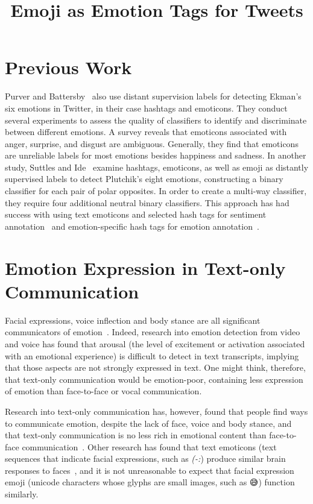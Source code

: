\documentclass[10pt, a4paper]{article}
\title{Emoji as Emotion Tags for Tweets}
\begin{document}
\maketitleabstract

\section{Previous Work} 
Purver and Battersby~ also use distant supervision labels for detecting Ekman’s six emotions in Twitter, in their case hashtags and emoticons. They conduct several experiments to assess the quality of classifiers to identify and discriminate between different emotions. A survey reveals that emoticons associated with anger, surprise, and disgust are ambiguous. Generally, they find that emoticons are unreliable labels for most emotions besides happiness and sadness. In another study, Suttles and Ide~ examine hashtags, emoticons, as well as emoji as distantly supervised labels to detect Plutchik’s eight emotions, constructing a binary classifier for each pair of polar opposites. In order to create a multi-way classifier, they require four additional neutral binary classifiers. 
This approach has had success with using text emoticons and selected hash tags for sentiment annotation~\cite{Davidov2010Enhanced} and emotion-specific hash tags for emotion annotation~\cite{Mohammad2012Emotional,Mohammad2015Using}.

\section{Emotion Expression in Text-only Communication}
\label{sec:emotion_expression_in_text_only_communication}
Facial expressions, voice inflection and body stance are all significant communicators of emotion~\cite{Johnston2015Apa}. 
Indeed, research into emotion detection from video and voice has found that arousal (the level of excitement or activation associated with an emotional experience) is 
difficult to detect in text transcripts, implying that those aspects are not strongly expressed in text.
One might think, therefore, that text-only communication would be emotion-poor, containing less expression of emotion than face-to-face or vocal communication.

Research into text-only communication has, however, found that people find ways to communicate emotion, despite the lack of face, voice and body stance, and that text-only communication is no less rich in emotional content than face-to-face communication~\cite{Derks2008Role}.
Other research has found that text emoticons (text sequences that indicate facial expressions, such as \emph{(-:}) produce similar brain responses to faces~\cite{Churches2014Emoticons}, and it is not unreasonable to expect that facial expression emoji (unicode characters whose glyphs are small images, such as 😅) function similarly.
\end{document}
